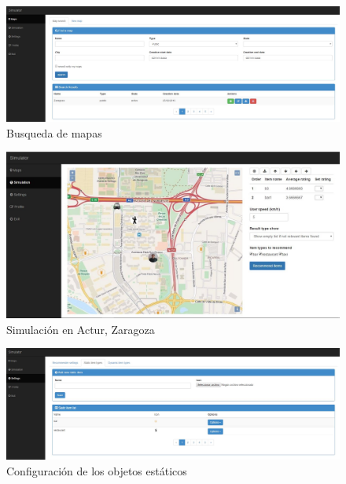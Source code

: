 \begin{figure}[H]
\centering\includegraphics[scale=0.25]{imagenes/busqueda-de-mapas.jpg}
\caption{Busqueda de mapas}
\label{BusquedaMapas}
\end{figure}

\begin{figure}[H]
\centering\includegraphics[scale=0.35]{imagenes/resumen-simulador.jpg}
\caption{Simulación en Actur, Zaragoza}
\label{simulacionActur}
\end{figure}

\begin{figure}[H]
\centering\includegraphics[scale=0.25]{imagenes/config-objetos-estaticos.jpg}
\caption{Configuración de los objetos estáticos}
\label{ConfigStaticItem}
\end{figure}